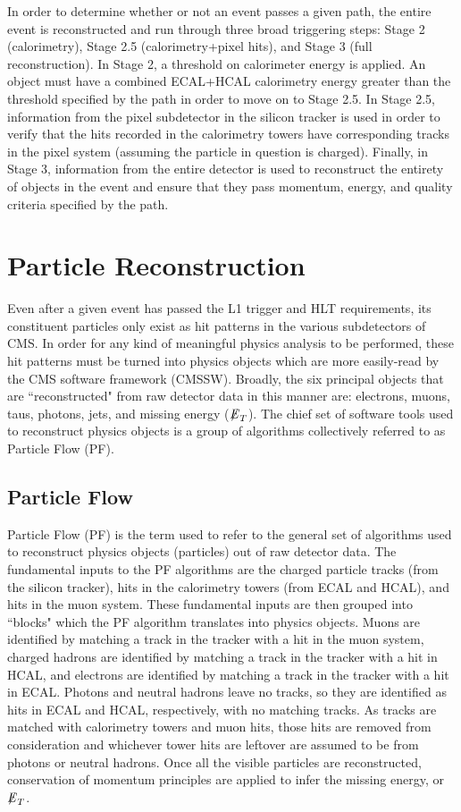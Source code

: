In order to determine whether or not an event passes a given path, the entire event is reconstructed and run through three broad triggering steps: Stage 2 (calorimetry), Stage 2.5 (calorimetry+pixel hits), and Stage 3 (full reconstruction). In Stage 2, a threshold on calorimeter energy is applied. An object must have a combined ECAL+HCAL calorimetry energy greater than the threshold specified by the path in order to move on to Stage 2.5. In Stage 2.5, information from the pixel subdetector in the silicon tracker is used in order to verify that the hits recorded in the calorimetry towers have corresponding tracks in the pixel system (assuming the particle in question is charged). Finally, in Stage 3, information from the entire detector is used to reconstruct the entirety of objects in the event and ensure that they pass momentum, energy, and quality criteria specified by the path.\cite{TDR}



\section{Particle Reconstruction}

Even after a given event has passed the L1 trigger and HLT requirements, its constituent particles only exist as hit patterns in the various subdetectors of CMS. In order for any kind of meaningful physics analysis to be performed, these hit patterns must be turned into physics objects which are more easily-read by the CMS software framework (CMSSW). Broadly, the six principal objects that are ``reconstructed" from raw detector data in this manner are: electrons, muons, taus, photons, jets, and missing energy (${\not\mathrel{E}}_T$). The chief set of software tools used to reconstruct physics objects is a group of algorithms collectively referred to as Particle Flow (PF).

\subsection{Particle Flow}

Particle Flow (PF) is the term used to refer to the general set of algorithms used to reconstruct physics objects (particles) out of raw detector data. The fundamental inputs to the PF algorithms are the charged particle tracks (from the silicon tracker), hits in the calorimetry towers (from ECAL and HCAL), and hits in the muon system. These fundamental inputs are then grouped into ``blocks" which the PF algorithm translates into physics objects. Muons are identified by matching a track in the tracker with a hit in the muon system, charged hadrons are identified by matching a track in the tracker with a hit in HCAL, and electrons are identified by matching a track in the tracker with a hit in ECAL. Photons and neutral hadrons leave no tracks, so they are identified as hits in ECAL and HCAL, respectively, with no matching tracks. As tracks are matched with calorimetry towers and muon hits, those hits are removed from consideration and whichever tower hits are leftover are assumed to be from photons or neutral hadrons. Once all the visible particles are reconstructed, conservation of momentum principles are applied to infer the missing energy, or ${\not\mathrel{E}}_T$.

